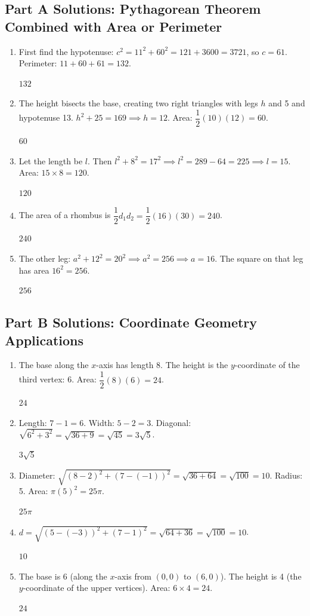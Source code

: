 \documentclass[14pt]{extarticle}
\begin{document}
\subsection*{Part A Solutions: Pythagorean Theorem Combined with Area or Perimeter}
\begin{enumerate}
  \item First find the hypotenuse: \(c^2 = 11^2 + 60^2 = 121 + 3600 = 3721\), so \(c = 61\). Perimeter: \(11 + 60 + 61 = 132\).

  \(\boxed{132}\)

  \item The height bisects the base, creating two right triangles with legs \(h\) and 5 and hypotenuse 13. \(h^2 + 25 = 169 \implies h = 12\). Area: \(\dfrac{1}{2}(10)(12) = 60\).

  \(\boxed{60}\)

  \item Let the length be \(l\). Then \(l^2 + 8^2 = 17^2 \implies l^2 = 289 - 64 = 225 \implies l = 15\). Area: \(15 \times 8 = 120\).

  \(\boxed{120}\)

  \item The area of a rhombus is \(\dfrac{1}{2} d_1 d_2 = \dfrac{1}{2}(16)(30) = 240\).

  \(\boxed{240}\)

  \item The other leg: \(a^2 + 12^2 = 20^2 \implies a^2 = 256 \implies a = 16\). The square on that leg has area \(16^2 = 256\).

  \(\boxed{256}\)
\end{enumerate}

\subsection*{Part B Solutions: Coordinate Geometry Applications}
\begin{enumerate}
  \item The base along the \(x\)-axis has length 8. The height is the \(y\)-coordinate of the third vertex: 6. Area: \(\dfrac{1}{2}(8)(6) = 24\).

  \(\boxed{24}\)

  \item Length: \(7 - 1 = 6\). Width: \(5 - 2 = 3\). Diagonal: \(\sqrt{6^2 + 3^2} = \sqrt{36 + 9} = \sqrt{45} = 3\sqrt{5}\).

  \(\boxed{3\sqrt{5}}\)

  \item Diameter: \(\sqrt{(8-2)^2 + (7-(-1))^2} = \sqrt{36 + 64} = \sqrt{100} = 10\). Radius: 5. Area: \(\pi(5)^2 = 25\pi\).

  \(\boxed{25\pi}\)

  \item \(d = \sqrt{(5-(-3))^2 + (7-1)^2} = \sqrt{64 + 36} = \sqrt{100} = 10\).

  \(\boxed{10}\)

  \item The base is 6 (along the \(x\)-axis from \((0,0)\) to \((6,0)\)). The height is 4 (the \(y\)-coordinate of the upper vertices). Area: \(6 \times 4 = 24\).

  \(\boxed{24}\)
\end{enumerate}
\end{document}
